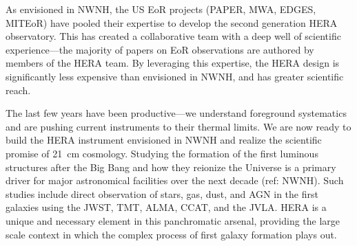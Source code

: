 \documentclass[preprint]{aastex}
\begin{document}
As envisioned in NWNH, the US EoR projects (PAPER, MWA, EDGES, MITEoR) have
pooled their expertise to develop the second generation HERA observatory. This
has created a collaborative team with a deep well of scientific
experience---the majority of papers on EoR observations are authored by members
of the HERA team. By leveraging this expertise, the HERA design is significantly
less expensive than envisioned in NWNH, and has greater scientific reach.

The last few years have been productive---we
understand foreground systematics and are pushing current
instruments to their thermal limits. We are now ready to build the HERA
instrument envisioned in NWNH and realize the scientific promise of 21~cm
cosmology.
Studying the formation of the first luminous structures after the Big
Bang and how they reionize the Universe is a primary driver for 
major astronomical facilities over the next decade (ref: NWNH).
Such studies include direct observation of stars, gas, dust, and AGN in the
first galaxies using the JWST, TMT, ALMA, CCAT, and the JVLA. HERA is %
a unique and necessary element in this panchromatic arsenal, providing
the large scale context in which the complex process of first galaxy
formation plays out.

\clearpage
\setcounter{page}{1}
\thispagestyle{empty}
%
%

%

\end{document}
